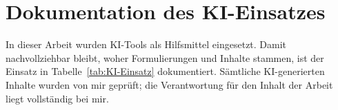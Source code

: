 %
%
%
%
%

\chapter{Dokumentation des KI-Einsatzes}
\label{cha:KI-Dokumentation}

In dieser Arbeit wurden KI-Tools als Hilfsmittel eingesetzt. Damit nachvollziehbar bleibt, woher Formulierungen und Inhalte stammen, ist der Einsatz in Tabelle~\ref{tab:KI-Einsatz} dokumentiert. Sämtliche KI-generierten Inhalte wurden von mir geprüft; die Verantwortung für den Inhalt der Arbeit liegt vollständig bei mir.


